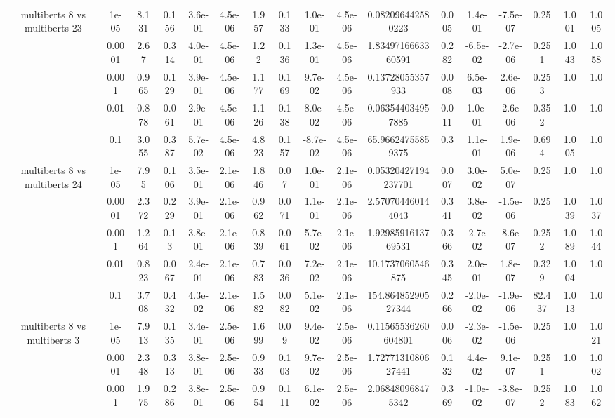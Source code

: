 \begin{tabular}{|c|c|c|c|c|c|c|c|c|c|c|c|c|c|c|c|c|}
\hline
\multirow{5}{*}{multiberts 8 vs multiberts 23} & 1e-05 & 8.131 & 0.156 & 3.6e-01 & 4.5e-06 & 1.957 & 0.133 & 1.0e-01 & 4.5e-06 & 0.082096442580223 & 0.005 & 1.4e-01 & -7.5e-07 & 0.25 & 1.001 & 1.005 \\
 & 0.0001 & 2.67 & 0.314 & 4.0e-01 & 4.5e-06 & 1.22 & 0.136 & 1.3e-01 & 4.5e-06 & 1.8349716663360591 & 0.282 & -6.5e-02 & -2.7e-06 & 0.251 & 1.043 & 1.058 \\
 & 0.001 & 0.965 & 0.129 & 3.9e-01 & 4.5e-06 & 1.177 & 0.169 & 9.7e-02 & 4.5e-06 & 0.13728055357933 & 0.008 & 6.5e-03 & 2.6e-06 & 0.253 & 1.0 & 1.0 \\
 & 0.01 & 0.878 & 0.061 & 2.9e-01 & 4.5e-06 & 1.126 & 0.138 & 8.0e-02 & 4.5e-06 & 0.063544034957885 & 0.011 & 1.0e-01 & -2.6e-06 & 0.352 & 1.0 & 1.0 \\
 & 0.1 & 3.055 & 0.387 & 5.7e-02 & 4.5e-06 & 4.823 & 0.157 & -8.7e-02 & 4.5e-06 & 65.96624755859375 & 0.3 & 1.1e-01 & 1.9e-06 & 0.694 & 1.005 & 1.0 \\
\hline
\multirow{5}{*}{multiberts 8 vs multiberts 24} & 1e-05 & 7.95 & 0.106 & 3.5e-01 & 2.1e-06 & 1.846 & 0.07 & 1.0e-01 & 2.1e-06 & 0.05320427194237701 & 0.007 & 3.0e-02 & 5.0e-07 & 0.25 & 1.0 & 1.0 \\
 & 0.0001 & 2.372 & 0.229 & 3.9e-01 & 2.1e-06 & 0.962 & 0.071 & 1.1e-01 & 2.1e-06 & 2.570704460144043 & 0.341 & 3.8e-02 & -1.5e-06 & 0.25 & 1.039 & 1.037 \\
 & 0.001 & 1.264 & 0.13 & 3.8e-01 & 2.1e-06 & 0.839 & 0.061 & 5.7e-02 & 2.1e-06 & 1.9298591613769531 & 0.366 & -2.7e-02 & -8.6e-07 & 0.252 & 1.089 & 1.044 \\
 & 0.01 & 0.823 & 0.067 & 2.4e-01 & 2.1e-06 & 0.783 & 0.036 & 7.2e-02 & 2.1e-06 & 10.1737060546875 & 0.345 & 2.0e-01 & 1.8e-07 & 0.329 & 1.004 & 1.0 \\
 & 0.1 & 3.708 & 0.432 & 4.3e-02 & 2.1e-06 & 1.582 & 0.082 & 5.1e-02 & 2.1e-06 & 154.86485290527344 & 0.266 & -2.0e-02 & -1.9e-06 & 82.437 & 1.013 & 1.0 \\
\hline
\multirow{5}{*}{multiberts 8 vs multiberts 3} & 1e-05 & 7.913 & 0.135 & 3.4e-01 & 2.5e-06 & 1.699 & 0.09 & 9.4e-02 & 2.5e-06 & 0.11565536260604801 & 0.006 & -2.3e-02 & -1.5e-06 & 0.25 & 1.0 & 1.021 \\
 & 0.0001 & 2.348 & 0.313 & 3.8e-01 & 2.5e-06 & 0.933 & 0.103 & 9.7e-02 & 2.5e-06 & 1.7277131080627441 & 0.132 & 4.4e-02 & 9.1e-07 & 0.251 & 1.0 & 1.002 \\
 & 0.001 & 1.975 & 0.286 & 3.8e-01 & 2.5e-06 & 0.954 & 0.111 & 6.1e-02 & 2.5e-06 & 2.068480968475342 & 0.369 & -1.0e-02 & -3.8e-07 & 0.252 & 1.083 & 1.062 \\

\end{tabular}
